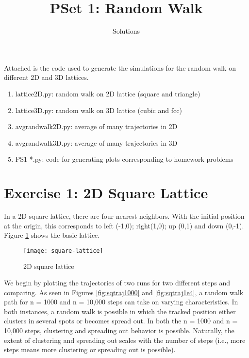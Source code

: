 \documentclass[12pt, oneside]{article}
\title{PSet 1: Random Walk}
\author{Solutions}
\date{}							%
\begin{document}
\maketitle

Attached is the code used to generate the simulations for the random walk on different 2D and 3D lattices.

  \begin{enumerate}
    \item lattice\textunderscore2D.py: random walk on 2D lattice (square and triangle)
    \item lattice\textunderscore3D.py: random walk on 3D lattice (cubic and fcc)
    \item avg\textunderscore rand\textunderscore walk\textunderscore2D.py: average of many trajectories in 2D
    \item avg\textunderscore rand\textunderscore walk\textunderscore3D.py: average of many trajectories in 3D
    \item PS1-*.py: code for generating plots corresponding to homework problems
  \end{enumerate}

\section{Exercise 1: 2D Square Lattice}
In a 2D square lattice, there are four nearest neighbors. With the initial position at the origin, this corresponds to left (-1,0); right(1,0); up (0,1) and down (0,-1). Figure \ref{fig:sqlattice} shows the basic lattice.

\begin{figure}[htbp]
   \centering
   \texttt{[image: square-lattice]} %
   \caption{2D square lattice}
   \label{fig:sqlattice}
\end{figure}
We begin by plotting the trajectories of two runs for two different steps and comparing. As seen in Figures \ref{fig:sqtraj1000} and \ref{fig:sqtraj1e4}, a random walk path for n = 1000 and n = 10,000 steps can take on varying characteristics. In both instances, a random walk is possible in which the tracked position either clusters in several spots or becomes spread out. In both the n = 1000 and n = 10,000 steps, clustering and spreading out behavior is possible. Naturally, the extent of clustering and spreading out scales with the number of steps (i.e., more steps means more clustering or spreading out is possible).
\end{document}
